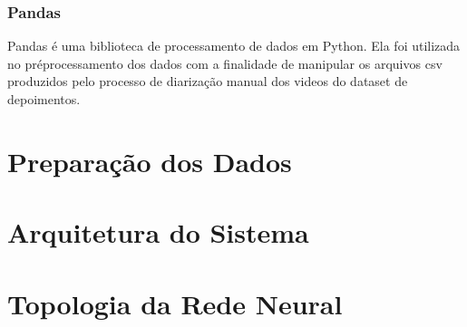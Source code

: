 \subsubsection{Pandas}

Pandas \cite{mckinney-proc-scipy-2010} é uma biblioteca de processamento de dados em Python. Ela foi utilizada no préprocessamento dos dados com a finalidade de manipular os arquivos csv produzidos pelo processo de diarização manual dos videos do dataset de depoimentos.

\section{Preparação dos Dados}
\label{sec:preproc}


\section{Arquitetura do Sistema}
\label{sec:sysarch}


\section{Topologia da Rede Neural}
\label{sec:topology}

